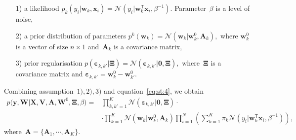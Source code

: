\documentclass[12pt, twoside]{article}
\begin{document}
\begin{enumerate}
	\item[1)] a likelihood $p_{k}\left(y_{i}|\mathbf{w}_{k}, \mathbf{x}_{i}\right) = \mathcal{N}\left(y_{i}|\mathbf{w}_{k}^{\mathsf{T}}\mathbf{x}_{i}, \beta^{-1}\right).$ Parameter~$\beta$ is a level of noise,
	\item[2)] a prior distribution of parameters $p^{k}\left(\mathbf{w}_{k}\right) = \mathcal{N}\left(\mathbf{w}_{k}|\mathbf{w}^{0}_{k}, \mathbf{A}_{k}\right),$ where $\mathbf{w}^{0}_{k}$ is a vector of size $n\times1$ and~$\mathbf{A}_{k}$ is a covariance matrix,
	\item[3)] prior regularisation $p\left(\bm{\varepsilon}_{k,k'}|\bm{\Xi}\right) = \mathcal{N}\left(\bm{\varepsilon}_{k,k'}|\mathbf{0},  \bm{\Xi}\right),$ where~$\bm{\Xi}$ is a covariance matrix and $\bm{\varepsilon}_{k,k'} = \mathbf{w}_{k}^{0}-\mathbf{w}_{k'}^{0}.$
\end{enumerate}
Combining assumption~$1), 2), 3)$ and equation~\eqref{eq:st:4}, we obtain
\[
\label{eq:em:1}
\begin{aligned}
p\bigr(\mathbf{y}, \mathbf{W}|\mathbf{X}, \mathbf{V}, \textbf{A}, \textbf{W}^{0}, \bm{\Xi}, \beta\bigr) = &\prod_{k,k'=1}^{K}\mathcal{N}\left(\bm{\varepsilon}_{k,k'}|\mathbf{0},  \bm{\Xi}\right)\cdot\\
&\cdot\prod_{k=1}^{K}\mathcal{N}\left(\mathbf{w}_{k}|\mathbf{w}^{0}_{k}, \mathbf{A}_{k}\right)\prod_{i=1}^{N}\left(\sum_{k=1}^{K}\pi_{k}\mathcal{N}\left(y_{i}|\mathbf{w}_{k}^{\mathsf{T}}\mathbf{x}_{i}, \beta^{-1}\right)\right),
\end{aligned}
\]
 where~$\mathbf{A} = \bigr\{\mathbf{A}_1, \cdots, \mathbf{A}_K\bigr\}.$
 
\end{document}
